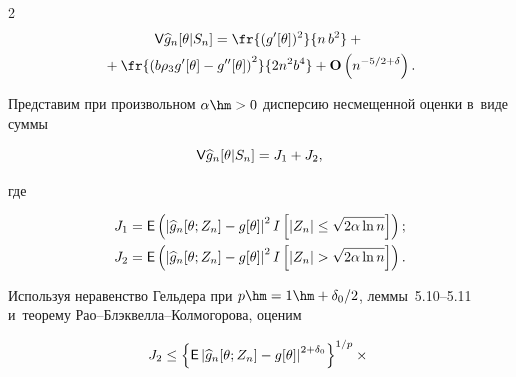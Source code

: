 \begin{multicols}{2}
 \begin{multline*}


 \Vp \widehat{g}_n[\theta|S_n]=


 \fr{(g'[\theta])^2}{n\,b^2} +{}\\


 {}+


 \fr{\left(b \rho_3 g'[\theta]-g''[\theta ]\right)^2}{2 n^2 b^4}


 + \Op\left( n^{-5/2+\delta}\right).




 \end{multline*}





 \Do


   Представим при произвольном $\alpha\hm>0$ дисперсию несмещенной оценки в~виде суммы


 \begin{equation}


 \Vp \widehat{g}_n[\theta|S_n]=J_1+J_2,


 \label{T:7.1-2}


 \end{equation}


 где


 \begin{align*}


  J_1& = \Ep \left(\left|\widehat{g}_n[\theta;Z_n]-g[\theta] \right|^2


  I\left[|Z_n|\le \sqrt{2\alpha\ln n}\right]\right);


\\


  J_2& =\Ep \left(\left|\widehat{g}_n[\theta;Z_n]-g[\theta] \right|^2


  I\left[|Z_n|> \sqrt{2\alpha\ln n}\right]\right).


 \end{align*}





 Используя неравенство Гельдера при $p\hm=1\hm+\delta_0/2$, леммы~5.10--5.11 и~теорему Рао--Блэк\-вел\-ла--Кол\-мо\-го\-ро\-ва, оценим


 \begin{multline}


 J_2\le \left\{\Ep \left|


  \widehat{g}_n[\theta;Z_n]-g[\theta] \right|^{2+\delta_0}\right\}^{1/p}\times{}\\



\end{multline}
\end{multicols}
